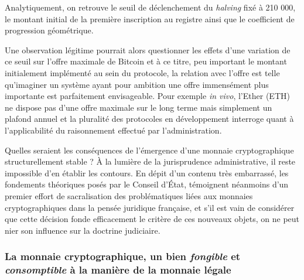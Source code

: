 {Analytiquement, on retrouve le seuil de déclenchement du \emph{halving} fixé à 210 000, le montant initial de la première inscription au registre ainsi que le coefficient de progression géométrique.\par 

Une observation légitime pourrait alors questionner les effets d'une variation de ce seuil sur l'offre maximale de Bitcoin et à ce titre, peu important le montant initialement implémenté au sein du protocole, la relation avec l'offre est telle qu'imaginer un système ayant pour ambition une offre immensément plus importante est parfaitement envisageable. Pour exemple \emph{in vivo}, l'Ether (\acrshort{ETH}) ne dispose pas d'une offre maximale sur le long terme mais simplement un plafond annuel et la pluralité des protocoles en développement interroge quant à l'applicabilité du raisonnement effectué par l'administration.\par

Quelles seraient les conséquences de l'émergence d'une monnaie cryptographique structurellement stable ? À la lumière de la jurisprudence administrative, il reste impossible d'en établir les contours. En dépit d'un contenu très embarrassé, les fondements théoriques posés par le Conseil d'État, témoignent néanmoins d'un premier effort de sacralisation des problématiques liées aux monnaies cryptographiques dans la pensée juridique française, et s'il est vain de considérer que cette décision fonde efficacement le critère de ces nouveaux objets, on ne peut nier son influence sur la doctrine judiciaire.\par

 \subsubsection{La monnaie cryptographique, un bien \emph{fongible} et \emph{consomptible} à la manière de la monnaie légale}

}
